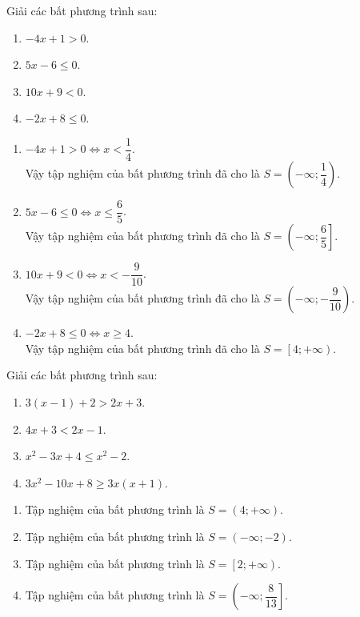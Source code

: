 \begin{bt}%
	Giải các bất phương trình sau:
	\begin{multicols}{2}
		\begin{enumerate}
			\item $-4x + 1 >0$.
			\item $5x - 6 \leq 0$.
			\item $10x + 9 < 0$.
			\item $-2x + 8 \leq 0$.
		\end{enumerate}
	\end{multicols}
	\loigiai
	{
		\begin{enumerate}
			\item $-4x + 1 >0 \Leftrightarrow x < \dfrac{1}{4}$.\\
			Vậy tập nghiệm của bất phương trình đã cho là $S = \left(-\infty; \dfrac{1}{4}\right)$.
			\item $5x - 6 \leq 0 \Leftrightarrow x \leq \dfrac{6}{5}$.\\
			Vậy tập nghiệm của bất phương trình đã cho là $S = \left(-\infty; \dfrac{6}{5}\right]$.
			\item $10x + 9 < 0 \Leftrightarrow x < -\dfrac{9}{10}$.\\
			Vậy tập nghiệm của bất phương trình đã cho là $S = \left(-\infty; -\dfrac{9}{10}\right)$.
			\item $-2x + 8 \leq 0 \Leftrightarrow x \geq 4$.\\
			Vậy tập nghiệm của bất phương trình đã cho là $S = \left[4; +\infty\right)$.
		\end{enumerate}
	}
\end{bt}


\begin{bt}%
	Giải các bất phương trình sau:
	\begin{multicols}{2}
		\begin{enumerate}
			\item $3(x-1)+2 > 2x +3$.
			\item $4x + 3 < 2x - 1$.
			\item $x^2 - 3x + 4 \leq x^2 - 2$.
			\item $3x^2 -10x + 8 \geq 3x(x+1)$.
		\end{enumerate}
	\end{multicols}
	\loigiai
	{
		\begin{enumerate}
			\item Tập nghiệm của bất phương trình là $S=\left(4; +\infty\right)$.
			\item Tập nghiệm của bất phương trình là $S=\left(-\infty; -2\right)$.
			\item Tập nghiệm của bất phương trình là $S=\left[2; +\infty\right)$.
			\item Tập nghiệm của bất phương trình là $S=\left(-\infty; \dfrac{8}{13}\right]$.
		\end{enumerate}
	}
\end{bt}


